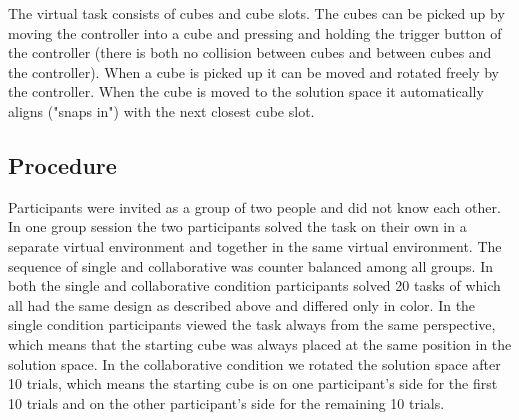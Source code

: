 \documentclass{article}
\begin{document}
The virtual task consists of cubes and cube slots. The cubes can be picked up by moving the controller into a cube and pressing and holding the trigger button of the controller (there is both no collision between cubes and between cubes and the controller). When a cube is picked up it can be moved and rotated freely by the controller. When the cube is moved to the solution space it  automatically aligns ("snaps in") with the next closest cube slot.






\subsection{Procedure}
Participants were invited as a group of two people and did not know each other. In one group session the two participants solved the task on their own in a separate virtual environment and together in the same virtual environment. The sequence of single and collaborative was counter balanced among all groups. In both the single and collaborative condition participants solved 20 tasks of which all had the same design as described above and differed only in color. In the single condition participants viewed the task always from the same perspective, which means that the starting cube was always placed at the same position in the solution space.
In the collaborative condition we rotated the solution space after 10 trials, which means the starting cube is on one participant's side for the first 10 trials and on the other participant's side for the remaining 10 trials. 
\end{document}
